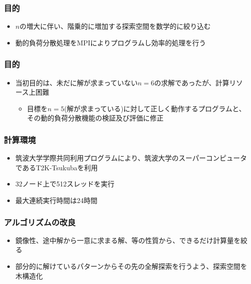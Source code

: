 \documentclass[dvipdfmx,20pt,notheorems,t]{beamer}
\begin{document}
\begin{frame}\frametitle{目的}
\begin{itemize}
\item $n$の増大に伴い、階乗的に増加する探索空間を数学的に絞り込む
\item 動的負荷分散処理をMPIによりプログラムし効率的処理を行う
\end{itemize}
\end{frame}

\begin{frame}\frametitle{目的}
\begin{itemize}
\item 当初目的は、未だに解が求まっていない$n=6$の求解であったが、計算リソース上困難
\begin{itemize}
\item 目標を$n=5$(解が求まっている)に対して正しく動作するプログラムと、その動的負荷分散機能の検証及び評価に修正
\end{itemize}
\end{itemize}
\end{frame}

\begin{frame}\frametitle{計算環境}
\begin{itemize}
\item 筑波大学学際共同利用プログラムにより、筑波大学のスーパーコンピュータであるT2K-Tsukubaを利用
\item 32ノード上で512スレッドを実行
\item 最大連続実行時間は24時間
\end{itemize}
\end{frame}

\begin{frame}\frametitle{アルゴリズムの改良}
\begin{itemize}
\item 鏡像性、途中解から一意に求まる解、等の性質から、できるだけ計算量を絞る
\item 部分的に解けているパターンからその先の全解探索を行うよう、探索空間を木構造化
\end{itemize}
\end{frame}
\end{document}
